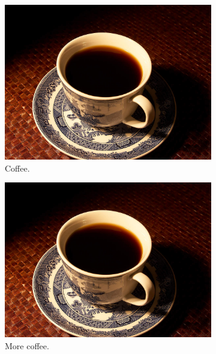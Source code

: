 \documentclass[a4paper,11pt]{article}
\begin{document}
\begin{figure}[h!]
	\centering
	\begin{subfigure}[b]{0.2\linewidth}
		\includegraphics[width=\linewidth]{coffee.jpg}
		\caption{Coffee.}
	\end{subfigure}
	\begin{subfigure}[b]{0.2\linewidth}
		\includegraphics[width=\linewidth]{coffee.jpg}
		\caption{More coffee.}
	\end{subfigure}
	\begin{subfigure}[b]{0.2\linewidth}

\end{subfigure}
\end{figure}
\end{document}
